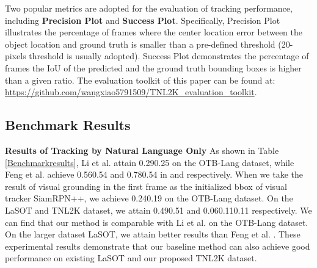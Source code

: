 \documentclass[final]{cvpr}
\begin{document}
Two popular metrics are adopted for the evaluation of tracking performance, including \textbf{Precision Plot} and \textbf{Success Plot}. Specifically, Precision Plot illustrates the percentage of frames where the center location error between the object location and ground truth is smaller than a pre-defined threshold (20-pixels threshold is usually adopted). Success Plot demonstrates the percentage of frames the IoU of the predicted and the ground truth bounding boxes is higher than a given ratio. The evaluation toolkit of this paper can be found at: \url{https://github.com/wangxiao5791509/TNL2K_evaluation_toolkit}. 




\subsection{Benchmark Results} 

\textbf{Results of Tracking by Natural Language Only}
As shown in Table \ref{Benchmarkresults}, Li et al. \cite{li2017tracking} attain 0.290.25 on the OTB-Lang dataset, while Feng et al. achieve 0.560.54 and 0.780.54 in  \cite{feng2020langTrackwacv} and \cite{feng2019robust} respectively. When we take the result of visual grounding in the first frame as the initialized bbox of visual tracker SiamRPN++, we achieve 0.240.19 on the OTB-Lang dataset. On the LaSOT and TNL2K dataset, we attain 0.490.51 and 0.060.110.11 respectively. We can find that our method is comparable with Li et al. on the OTB-Lang dataset. On the larger dataset LaSOT, we attain better results than Feng et al. \cite{feng2020langTrackwacv}. These experimental results demonstrate that our baseline method can also achieve good performance on existing LaSOT and our proposed TNL2K dataset. 
\end{document}

